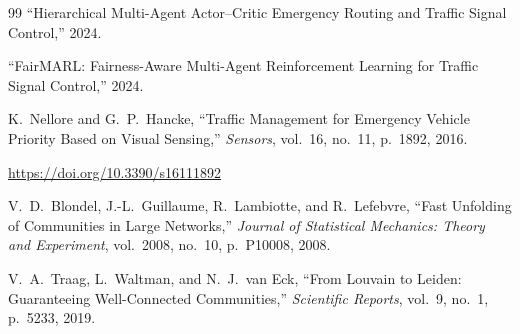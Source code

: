 \documentclass[3p,times]{elsarticle}
\theoremstyle{plain}
\theoremstyle{definition}
\begin{document}
\begin{thebibliography}{99}
``Hierarchical Multi-Agent Actor--Critic Emergency Routing and
Traffic Signal Control,''
2024.


``FairMARL: Fairness-Aware Multi-Agent Reinforcement Learning for
Traffic Signal Control,''
2024.


K.~Nellore and G.~P.~Hancke,
``Traffic Management for Emergency Vehicle Priority Based on
Visual Sensing,''
\textit{Sensors},
vol.~16, no.~11, p.~1892, 2016.

\url{https://doi.org/10.3390/s16111892}


V.~D.~Blondel, J.-L.~Guillaume, R.~Lambiotte, and R.~Lefebvre,
``Fast Unfolding of Communities in Large Networks,''
\textit{Journal of Statistical Mechanics: Theory and Experiment},
vol.~2008, no.~10, p.~P10008, 2008.

V.~A.~Traag, L.~Waltman, and N.~J.~van Eck,
``From Louvain to Leiden: Guaranteeing Well-Connected
Communities,''
\textit{Scientific Reports},
vol.~9, no.~1, p.~5233, 2019.

\end{thebibliography}
\end{document}
